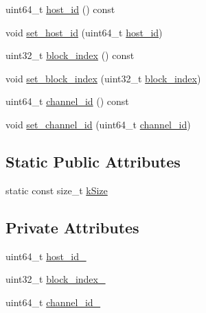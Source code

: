 \begin{DoxyCompactItemize}
\item 
uint64\-\_\-t \hyperlink{classapollo_1_1cyber_1_1transport_1_1ReadableInfo_ad9121226c3878f96c90bcfe7a65d2bcb}{host\-\_\-id} () const 
\item 
void \hyperlink{classapollo_1_1cyber_1_1transport_1_1ReadableInfo_a0b313d03e3ab9de710aa6d693a97e21e}{set\-\_\-host\-\_\-id} (uint64\-\_\-t \hyperlink{classapollo_1_1cyber_1_1transport_1_1ReadableInfo_ad9121226c3878f96c90bcfe7a65d2bcb}{host\-\_\-id})
\item 
uint32\-\_\-t \hyperlink{classapollo_1_1cyber_1_1transport_1_1ReadableInfo_affd26c2e8866cce02597a068c00dc2d4}{block\-\_\-index} () const 
\item 
void \hyperlink{classapollo_1_1cyber_1_1transport_1_1ReadableInfo_a5ba4adb5be7c3609b1a3ad1a907aba5b}{set\-\_\-block\-\_\-index} (uint32\-\_\-t \hyperlink{classapollo_1_1cyber_1_1transport_1_1ReadableInfo_affd26c2e8866cce02597a068c00dc2d4}{block\-\_\-index})
\item 
uint64\-\_\-t \hyperlink{classapollo_1_1cyber_1_1transport_1_1ReadableInfo_a2504f4ab55522fed58138e1ee8e52590}{channel\-\_\-id} () const 
\item 
void \hyperlink{classapollo_1_1cyber_1_1transport_1_1ReadableInfo_af907c8f5d7966d448310aa11b91ffc20}{set\-\_\-channel\-\_\-id} (uint64\-\_\-t \hyperlink{classapollo_1_1cyber_1_1transport_1_1ReadableInfo_a2504f4ab55522fed58138e1ee8e52590}{channel\-\_\-id})
\end{DoxyCompactItemize}
\subsection*{Static Public Attributes}
\begin{DoxyCompactItemize}
\item 
static const size\-\_\-t \hyperlink{classapollo_1_1cyber_1_1transport_1_1ReadableInfo_a4a104484fb37781746fb29e2e597007c}{k\-Size}
\end{DoxyCompactItemize}
\subsection*{Private Attributes}
\begin{DoxyCompactItemize}
\item 
uint64\-\_\-t \hyperlink{classapollo_1_1cyber_1_1transport_1_1ReadableInfo_a4c813a6f1cbc216f262f3a065f2d3480}{host\-\_\-id\-\_\-}
\item 
uint32\-\_\-t \hyperlink{classapollo_1_1cyber_1_1transport_1_1ReadableInfo_ab66c1d821d4e4c15109c9ea392f07b28}{block\-\_\-index\-\_\-}
\item 
uint64\-\_\-t \hyperlink{classapollo_1_1cyber_1_1transport_1_1ReadableInfo_af3f1b6b9fb05dc147574db8c2597c4c1}{channel\-\_\-id\-\_\-}
\end{DoxyCompactItemize}



